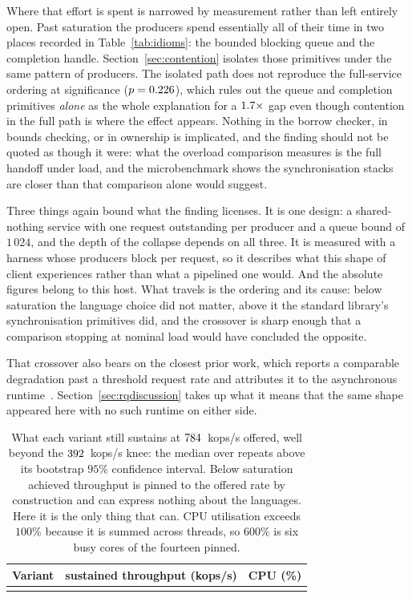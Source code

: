 \documentclass[english,twoside,openright,a4paper,censored,csm,software-track-2020]{HYthesisML}
\begin{document}
Where that effort is spent is narrowed by measurement rather than left entirely open. Past
saturation the producers spend essentially all of their time in two places recorded in
Table~\ref{tab:idioms}: the bounded blocking queue and the completion handle. Section~\ref{sec:contention}
isolates those primitives under the same pattern of \ContentionProducers{} producers. The isolated path does not
reproduce the full-service ordering at significance ($p = 0.226$), which rules out the
queue and completion primitives \emph{alone} as the whole explanation for a
$1.7\times$ gap even though contention in the full path is where the effect appears.
Nothing in the borrow checker, in bounds checking, or in ownership is implicated, and the finding
should not be quoted as though it were: what the overload comparison measures is the full
handoff under load, and the microbenchmark shows the synchronisation stacks are closer than that
comparison alone would suggest.

Three things again bound what the finding licenses. It is one design: a shared-nothing service with one
request outstanding per producer and a queue bound of $1\,024$, and the depth of the collapse
depends on all three. It is measured with a harness whose producers block per request, so it
describes what this shape of client experiences rather than what a pipelined one would.
And the absolute figures belong to this host. What travels is the ordering and its cause: below
saturation the language choice did not matter, above it the standard library's synchronisation
primitives did, and the crossover is sharp enough that a comparison stopping at nominal load
would have concluded the opposite.

That crossover also bears on the closest prior work, which reports a comparable degradation past
a threshold request rate and attributes it to the asynchronous
runtime~\cite{arvidsson2025async}. Section~\ref{sec:rqdiscussion} takes up what it means that the
same shape appeared here with no such runtime on either side.

\begin{table}[H]
\centering
\small
\caption[What each variant sustains past saturation]{What each variant still sustains at
$784$~kops/s offered, well beyond the $392$~kops/s knee: the median over
\NRepeats{} repeats above its bootstrap $95\%$ confidence interval. Below saturation achieved
throughput is pinned to the offered rate by construction and can express nothing about the
languages. Here it is the only thing that can. CPU utilisation exceeds $100\%$ because it is
summed across threads, so $600\%$ is six busy cores of the fourteen
pinned.\label{tab:overload}}
\begin{tabular}{@{}l r r@{}}
\hline\hline
Variant & sustained throughput (kops/s) & CPU (\%) \\
\hline
\\
\hline
\end{tabular}
\end{table}
\end{document}

